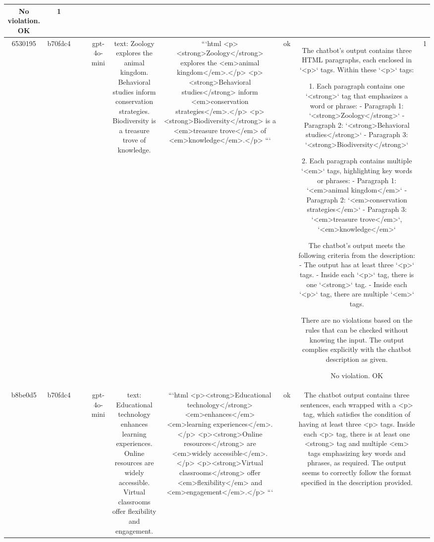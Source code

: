 \begin{table}[h!]
\begin{tabular}{|c|c|c|c|c|c|c|c|c|c|}
No violation.
OK & 1\\
\hline
6530195 & b70fdc4 &  &  & gpt-4o-mini & text: Zoology explores the animal kingdom. Behavioral studies inform conservation strategies. Biodiversity is a treasure trove of knowledge. & ```html
<p><strong>Zoology</strong> explores the <em>animal kingdom</em>.</p>
<p><strong>Behavioral studies</strong> inform <em>conservation strategies</em>.</p>
<p><strong>Biodiversity</strong> is a <em>treasure trove</em> of <em>knowledge</em>.</p>
``` & ok & The chatbot's output contains three HTML paragraphs, each enclosed in `<p>` tags. Within these `<p>` tags:

1. Each paragraph contains one `<strong>` tag that emphasizes a word or phrase:
   - Paragraph 1: `<strong>Zoology</strong>`
   - Paragraph 2: `<strong>Behavioral studies</strong>`
   - Paragraph 3: `<strong>Biodiversity</strong>`

2. Each paragraph contains multiple `<em>` tags, highlighting key words or phrases:
   - Paragraph 1: `<em>animal kingdom</em>`
   - Paragraph 2: `<em>conservation strategies</em>`
   - Paragraph 3: `<em>treasure trove</em>`, `<em>knowledge</em>`

The chatbot's output meets the following criteria from the description:
- The output has at least three `<p>` tags.
- Inside each `<p>` tag, there is one `<strong>` tag.
- Inside each `<p>` tag, there are multiple `<em>` tags.

There are no violations based on the rules that can be checked without knowing the input. The output complies explicitly with the chatbot description as given.

No violation.
OK & 1\\
\hline
b8be0d5 & b70fdc4 &  &  & gpt-4o-mini & text: Educational technology enhances learning experiences. Online resources are widely accessible. Virtual classrooms offer flexibility and engagement. & ```html
<p><strong>Educational technology</strong> <em>enhances</em> <em>learning experiences</em>.</p>
<p><strong>Online resources</strong> are <em>widely accessible</em>.</p>
<p><strong>Virtual classrooms</strong> offer <em>flexibility</em> and <em>engagement</em>.</p>
``` & ok & The chatbot output contains three sentences, each wrapped with a <p> tag, which satisfies the condition of having at least three <p> tags. Inside each <p> tag, there is at least one <strong> tag and multiple <em> tags emphasizing key words and phrases, as required. The output seems to correctly follow the format specified in the description provided.


\end{tabular}
\end{table}
